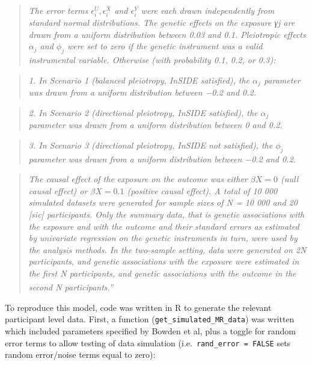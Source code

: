 \documentclass[
]{article}
\begin{document}
\begin{quote}
\emph{The error terms \(\epsilon_i^U , \epsilon_i^X\) and \(\epsilon_i^Y\) were each drawn independently from standard normal distributions. The genetic effects on the exposure γj are drawn from a uniform distribution between 0.03 and 0.1. Pleiotropic effects \(\alpha_j\) and \(\phi_j\) were set to zero if the genetic instrument was a valid instrumental variable. Otherwise (with probability 0.1, 0.2, or 0.3):}
\end{quote}

\begin{quote}
\emph{1. In Scenario 1 (balanced pleiotropy, InSIDE satisfied), the \(\alpha_j\) parameter was drawn from a uniform distribution between −0.2 and 0.2.}
\end{quote}

\begin{quote}
\emph{2. In Scenario 2 (directional pleiotropy, InSIDE satisfied), the \(\alpha_j\) parameter was drawn from a uniform distribution between 0 and 0.2.}
\end{quote}

\begin{quote}
\emph{3. In Scenario 3 (directional pleiotropy, InSIDE not satisfied), the \(\phi_j\) parameter was drawn from a uniform distribution between −0.2 and 0.2.}
\end{quote}

\begin{quote}
\emph{The causal effect of the exposure on the outcome was either \(\beta X = 0\) (null causal effect) or \(\beta X = 0.1\) (positive causal effect). A total of 10 000 simulated datasets were generated for sample sizes of N = 10 000 and 20 {[}sic{]} participants. Only the summary data, that is genetic associations with the exposure and with the outcome and their standard errors as estimated by univariate regression on the genetic instruments in turn, were used by the analysis methods. In the two-sample setting, data were generated on 2N participants, and genetic associations with the exposure were estimated in the first N participants, and genetic associations with the outcome in the second N participants.''}\textsuperscript{}
\end{quote}

To reproduce this model, code was written in R to generate the relevant participant level data. First, a function (\texttt{get\_simulated\_MR\_data}) was written which included parameters specified by Bowden et al, plus a toggle for random error terms to allow testing of data simulation (i.e.~\texttt{rand\_error\ =\ FALSE} sets random error/noise terms equal to zero):
\end{document}
